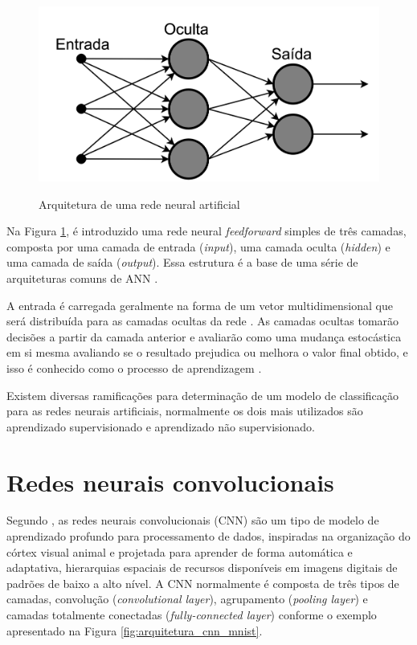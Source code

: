 \documentclass[
	12pt,				%
	oneside,			%
	a4paper,			%
	english,			%
	brazil				%
	]{abntex2ppgsi}
\begin{document}
\begin{figure}[H]
    \centering
    \caption{Arquitetura de uma rede neural artificial}
    \includegraphics[scale=.25]{imagens/conceitos_basicos/artificial_neural_networks_arch.jpg}
    \label{fig:artificial_neural_networks_arch}
\end{figure}

Na Figura \ref{fig:artificial_neural_networks_arch}, é introduzido uma rede neural \textit{feedforward} simples de três camadas, composta por uma camada de entrada (\textit{input}), uma camada oculta (\textit{hidden}) e uma camada de saída (\textit{output}). Essa estrutura é a base de uma série de arquiteturas comuns de ANN \cite{o2015introduction}.

A entrada é carregada geralmente na forma de um vetor multidimensional que será distribuída para as camadas ocultas da rede \cite{o2015introduction}. As camadas ocultas tomarão decisões a partir da camada anterior e avaliarão como uma mudança estocástica em si mesma avaliando se o resultado prejudica ou melhora o valor final obtido, e isso é conhecido como o processo de aprendizagem \cite{o2015introduction}. 

Existem diversas ramificações para determinação de um modelo de classificação para as redes neurais artificiais, normalmente os dois mais utilizados são aprendizado supervisionado e aprendizado não supervisionado.

\section{Redes neurais convolucionais}
Segundo \cite{yamashita2018convolutional}, as redes neurais convolucionais (CNN) são um tipo de modelo de aprendizado profundo para processamento de dados, inspiradas na organização do córtex visual animal e projetada para aprender de forma automática e adaptativa, hierarquias espaciais de recursos disponíveis em imagens digitais de padrões de baixo a alto nível. A CNN normalmente é composta de três tipos de camadas, convolução (\textit{convolutional layer}), agrupamento (\textit{pooling layer}) e camadas totalmente conectadas (\textit{fully-connected layer}) conforme o exemplo apresentado na Figura \ref{fig:arquitetura_cnn_mnist}.
\end{document}

